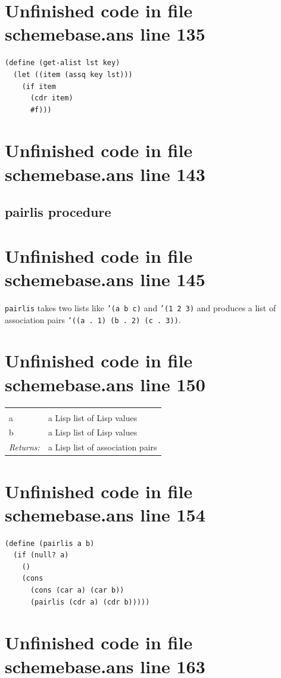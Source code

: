 \documentclass[twoside,9pt]{report}
\begin{document}
\section{Unfinished code in file schemebase.ans line 135}
\begin{lstlisting}
(define (get-alist lst key)
  (let ((item (assq key lst)))
    (if item
      (cdr item)
      #f)))
\end{lstlisting}
\section{Unfinished code in file schemebase.ans line 143}
\subsection{pairlis procedure}
\label{pairlis-procedure}
\section{Unfinished code in file schemebase.ans line 145}


\texttt{pairlis} takes two lists like \texttt{'(a b c)} and \texttt{'(1 2 3)} and produces a list of association pairs \texttt{'((a . 1) (b . 2) (c . 3))}.

\section{Unfinished code in file schemebase.ans line 150}
\noindent\begin{tabular}{ |p{1.9cm} p{8cm}| }
\hline
\rowcolor[HTML]{CCCCCC} \multicolumn{2}{|l|}{\bf pairlis (public)} \\
a & a Lisp list of Lisp values \\
b & a Lisp list of Lisp values \\
\textit{Returns:} & a Lisp list of association pairs \\
\hline
\end{tabular}
\section{Unfinished code in file schemebase.ans line 154}
\begin{lstlisting}
(define (pairlis a b)
  (if (null? a)
    ()
    (cons
      (cons (car a) (car b))
      (pairlis (cdr a) (cdr b)))))
\end{lstlisting}
\section{Unfinished code in file schemebase.ans line 163}
\end{document}
